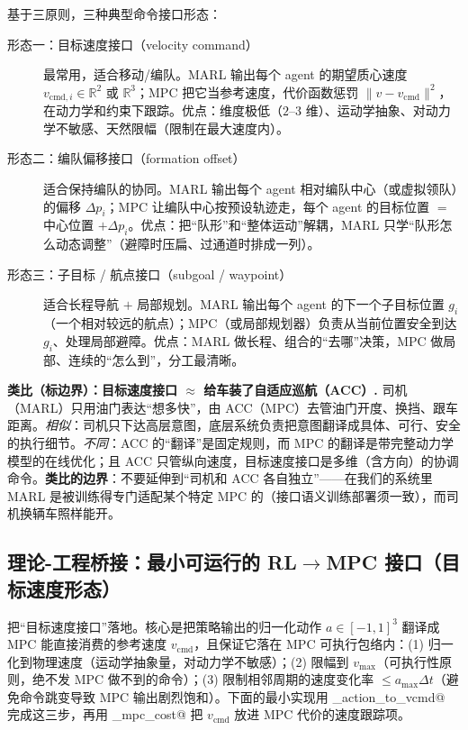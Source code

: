 基于三原则，三种典型命令接口形态：
\begin{description}
  \item[形态一：目标速度接口（velocity command）] 最常用，适合移动/编队。MARL 输出每个 agent 的期望质心速度 $v_{\text{cmd},i}\in\mathbb{R}^{2}$ 或 $\mathbb{R}^{3}$；MPC 把它当参考速度，代价函数惩罚 $\|v-v_{\text{cmd}}\|^2$，在动力学和约束下跟踪。优点：维度极低（$2$--$3$ 维）、运动学抽象、对动力学不敏感、天然限幅（限制在最大速度内）。
  \item[形态二：编队偏移接口（formation offset）] 适合保持编队的协同。MARL 输出每个 agent 相对编队中心（或虚拟领队）的偏移 $\Delta p_i$；MPC 让编队中心按预设轨迹走，每个 agent 的目标位置 $=$ 中心位置 $+\Delta p_i$。优点：把“队形”和“整体运动”解耦，MARL 只学“队形怎么动态调整”（避障时压扁、过通道时排成一列）。
  \item[形态三：子目标 / 航点接口（subgoal / waypoint）] 适合长程导航 $+$ 局部规划。MARL 输出每个 agent 的下一个子目标位置 $g_i$（一个相对较远的航点）；MPC（或局部规划器）负责从当前位置安全到达 $g_i$、处理局部避障。优点：MARL 做长程、组合的“去哪”决策，MPC 做局部、连续的“怎么到”，分工最清晰。
\end{description}

\begin{note}
\textbf{类比（标边界）：目标速度接口 $\approx$ 给车装了自适应巡航（ACC）.}\;
司机（MARL）只用油门表达“想多快”，由 ACC（MPC）去管油门开度、换挡、跟车距离。\emph{相似}：司机只下达高层意图，底层系统负责把意图翻译成具体、可行、安全的执行细节。\emph{不同}：ACC 的“翻译”是固定规则，而 MPC 的翻译是带完整动力学模型的在线优化；且 ACC 只管纵向速度，目标速度接口是多维（含方向）的协调命令。\textbf{类比的边界}：不要延伸到“司机和 ACC 各自独立”——在我们的系统里 MARL 是被训练得专门适配某个特定 MPC 的（接口语义训练部署须一致），而司机换辆车照样能开。
\end{note}

\subsection{理论-工程桥接：最小可运行的 RL$\to$MPC 接口（目标速度形态）}
\label{sec:mh-iface-code}

把“目标速度接口”落地。核心是把策略输出的归一化动作 $a\in[-1,1]^3$ 翻译成 MPC 能直接消费的参考速度 $v_{\text{cmd}}$，且保证它落在 MPC 可执行包络内：(1) 归一化到物理速度（运动学抽象量，对动力学不敏感）；(2) 限幅到 $v_{\max}$（可执行性原则，绝不发 MPC 做不到的命令）；(3) 限制相邻周期的速度变化率 $\le a_{\max}\Delta t$（避免命令跳变导致 MPC 输出剧烈饱和）。下面的最小实现用 \verb@policy_action_to_vcmd@ 完成这三步，再用 \verb@build_mpc_cost@ 把 $v_{\text{cmd}}$ 放进 MPC 代价的速度跟踪项。

